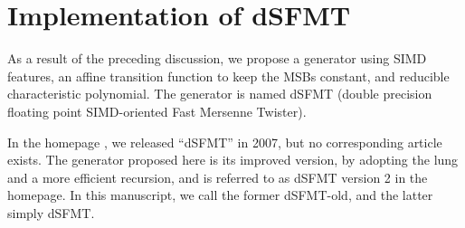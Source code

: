\documentclass{svmult}
\begin{document}





\section{Implementation of dSFMT}
\label{sec:implement}
As a result of the preceding discussion,
we propose a generator using SIMD features, an affine transition function
to keep the MSBs constant,
and reducible characteristic polynomial.
The generator is named dSFMT (double precision
floating point SIMD-oriented Fast Mersenne Twister).
\begin{remark}
In the homepage \cite{web:SFMT},
we released ``dSFMT'' in 2007,
but no corresponding article exists.
The generator proposed here is its improved version, by
adopting the lung and a more efficient recursion, and
is referred to as dSFMT version 2 in the homepage.
In this manuscript, we call the former dSFMT-old,
and the latter simply dSFMT.
\end{remark}
\end{document}
